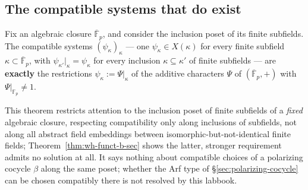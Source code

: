\subsection{The compatible systems that do exist}

\statusProved
\begin{theorem}
\label{thm:wh-funct-d}
Fix an algebraic closure $\overline{\mathbb{F}}_p$, and consider the
inclusion poset of its finite subfields. The compatible systems
$(\psi_\kappa)_\kappa$ — one $\psi_\kappa\in X(\kappa)$ for every finite
subfield $\kappa\subset\overline{\mathbb{F}}_p$, with
$\psi_{\kappa'}|_\kappa=\psi_\kappa$ for every inclusion $\kappa\subseteq\kappa'$
of finite subfields — are \textbf{exactly} the restrictions
$\psi_\kappa:=\Psi|_\kappa$ of the additive characters $\Psi$ of
$(\overline{\mathbb{F}}_p,+)$ with $\Psi|_{\mathbb{F}_p}\neq 1$.
\end{theorem}

\begin{scope}
This theorem restricts attention to the inclusion poset of finite subfields
of a \emph{fixed} algebraic closure, respecting compatibility only along
inclusions of subfields, not along all abstract field embeddings between
isomorphic-but-not-identical finite fields; Theorem~\ref{thm:wh-funct-b-sec}
shows the latter, stronger requirement admits no solution at all. It says
nothing about compatible choices of a polarizing cocycle $\beta$ along the
same poset; whether the Arf type of \S\ref{sec:polarizing-cocycle} can be
chosen compatibly there is not resolved by this labbook.
\end{scope}


